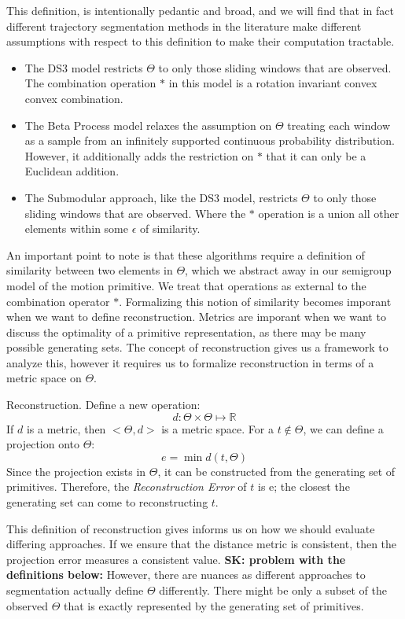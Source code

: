 This definition, is intentionally pedantic and broad, and we will find that in fact different trajectory segmentation methods 
in the literature make different assumptions with respect to this definition to make their computation tractable. 
\begin{itemize}
\item The DS3 model restricts $\Theta$ to only those sliding windows that are observed.
The combination operation $*$ in this model is a rotation invariant convex convex combination.
\item The Beta Process model relaxes the assumption on $\Theta$ treating each window as a sample from an
infinitely supported continuous probability distribution. However, it additionally adds the restriction on 
$*$ that it can only be a Euclidean addition.
\item The Submodular approach, like the DS3 model, restricts $\Theta$ to only those sliding windows that are observed.
Where the $*$ operation is a union all other elements within some $\epsilon$ of similarity.
\end{itemize}

An important point to note is that these algorithms require a definition of similarity between two elements in $\Theta$, which we abstract away
in our semigroup model of the motion primitive.
We treat that operations as external to the combination operator $*$.
Formalizing this notion of similarity becomes imporant when we want to define reconstruction.
Metrics are imporant when we want to discuss the optimality of a primitive representation,
as there may be many possible generating sets.
The concept of reconstruction gives us a framework to analyze this, however it requires us
to formalize reconstruction in terms of a metric space on $\Theta$.

\begin{definition} Reconstruction. 
Define a new operation:
\[ d:\Theta \times \Theta \mapsto \mathbb{R} \]
If $d$ is a metric, then $<\Theta,d>$ is a metric space.
For a $t \not \in \Theta$, we can define a projection onto
$\Theta$:
\[ e = \min d(t,\Theta) \]
Since the projection exists in $\Theta$, it can be constructed 
from the generating set of primitives.
Therefore, the \emph{Reconstruction Error} of $t$ is e; the closest
the generating set can come to reconstructing $t$.
\end{definition}

This definition of reconstruction gives informs us on how we should evaluate differing approaches. 
If we ensure that the distance metric is consistent, then the projection error measures a consistent value.
\textbf{SK: problem with the definitions below:}
However, there are nuances as different approaches to segmentation actually define $\Theta$ differently.
There might be only a subset of the observed $\Theta$ that is exactly represented by the generating set of primitives.

